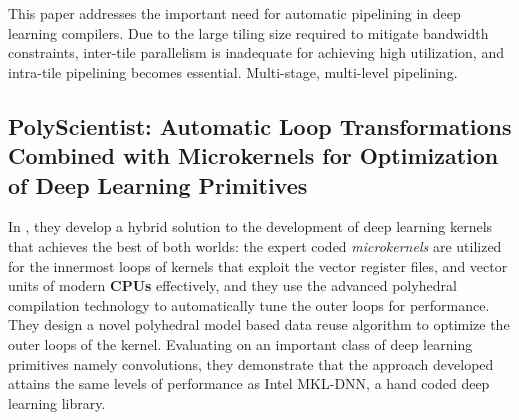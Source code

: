 This paper addresses the important need for automatic pipelining in deep learning compilers. Due to the large tiling size required to mitigate bandwidth constraints, inter-tile parallelism is inadequate for achieving high utilization, and intra-tile pipelining becomes essential. Multi-stage, multi-level pipelining.

\subsection{PolyScientist: Automatic Loop Transformations Combined with Microkernels for Optimization of Deep Learning Primitives}
In \cite{Tavarageri2020PolyScientistAL}, they develop a hybrid solution to the development of deep learning kernels that achieves the best of both worlds: the expert coded \textit{microkernels} are utilized for the innermost loops of kernels that exploit the vector register files, and vector units of modern \textbf{CPUs} effectively, and they use the advanced polyhedral compilation technology to automatically tune the outer loops for performance. They design a novel polyhedral model based data reuse algorithm to optimize the outer loops of the kernel. Evaluating on an important class of deep learning primitives namely convolutions, they demonstrate that the approach developed attains the same levels of performance as Intel MKL-DNN, a hand coded deep learning library.
